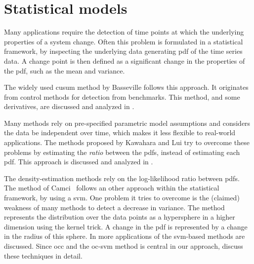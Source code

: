 \section{Statistical models}\label{sec:literature_review_statistical_models}
Many applications require the detection of time points at which the underlying properties of a system change.
Often this problem is formulated in a statistical framework, by inspecting the underlying data generating \gls{pdf} of the time series data.
A change point is then defined as a significant change in the properties of the \gls{pdf}, such as the mean and variance.

The widely used \gls{cusum} method by Basseville \etal \cite{basseville1993detection} follows this approach.
It originates from control methods for detection from benchmarks.
This method, and some derivatives, are discussed and analyzed in .

Many methods rely on pre-specified parametric model assumptions and considers the data be independent over time, which makes it less flexible to real-world applications.
The methods proposed by Kawahara \etal \cite{kawahara2009change} and Lui \etal \cite{liu2013change} try to overcome these problems by estimating the \emph{ratio} between the \glspl{pdf}, instead of estimating each \gls{pdf}.
This approach is discussed and analyzed in .

The density-estimation methods rely on the log-likelihood ratio between \glspl{pdf}.
The method of Camci~\cite{camci2010change} follows an other approach within the statistical framework, by using a \gls{svm}.
One problem it tries to overcome is the (claimed) weakness of many methods to detect a decrease in variance.
The method represents the distribution over the data points as a hypersphere in a higher dimension using the kernel trick.
A change in the \gls{pdf} is represented by a change in the radius of this sphere.
In  more applications of the \gls{svm}-based methods are discussed.
Since \gls{occ} and the \gls{oc-svm} method is central in our approach,  discuss these techniques in detail.

